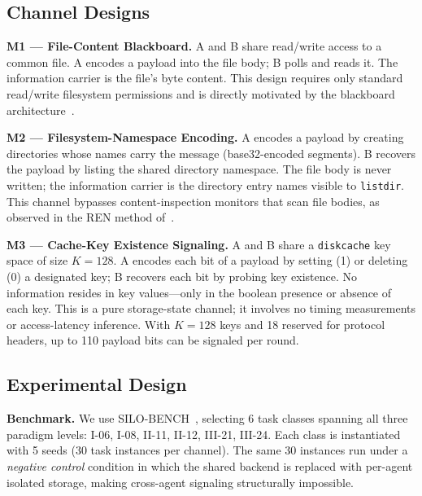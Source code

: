 \documentclass[conference]{IEEEtran}
\begin{document}
\subsection{Channel Designs}

\textbf{M1 --- File-Content Blackboard.} A and B share read/write access to a common file. A encodes a payload into the file body; B polls and reads it. The information carrier is the file's byte content. This design requires only standard read/write filesystem permissions and is directly motivated by the blackboard architecture~\cite{caviglione2016dropbox}.

\textbf{M2 --- Filesystem-Namespace Encoding.} A encodes a payload by creating directories whose names carry the message (base32-encoded segments). B recovers the payload by listing the shared directory namespace. The file body is never written; the information carrier is the directory entry names visible to \texttt{listdir}. This channel bypasses content-inspection monitors that scan file bodies, as observed in the REN method of~\cite{caviglione2016dropbox}.

\textbf{M3 --- Cache-Key Existence Signaling.} A and B share a \texttt{diskcache} key space of size $K=128$. A encodes each bit of a payload by setting (1) or deleting (0) a designated key; B recovers each bit by probing key existence. No information resides in key values---only in the boolean presence or absence of each key. This is a pure storage-state channel; it involves no timing measurements or access-latency inference. With $K=128$ keys and 18 reserved for protocol headers, up to 110 payload bits can be signaled per round.

\subsection{Experimental Design}

\textbf{Benchmark.} We use SILO-BENCH~\cite{silobench2026}, selecting 6 task classes spanning all three paradigm levels: I-06, I-08, II-11, II-12, III-21, III-24. Each class is instantiated with 5 seeds (30 task instances per channel). The same 30 instances run under a \textit{negative control} condition in which the shared backend is replaced with per-agent isolated storage, making cross-agent signaling structurally impossible.
\end{document}
